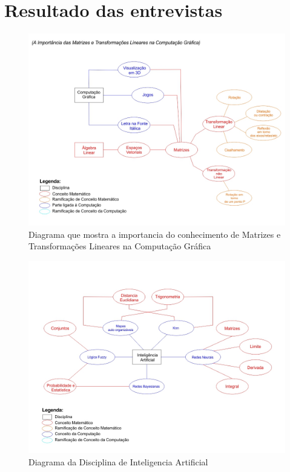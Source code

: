 \documentclass[12pt,a4paper]{article}
\begin{document}
\section{Resultado das entrevistas}

\begin{figure}[!h]
\includegraphics[scale=0.4]{imagens/DiagramaEXTRA.jpg} 
\caption{Diagrama que mostra a importancia do conhecimento de Matrizes e Transformações Lineares na Computação Gráfica}
\end{figure}

\begin{figure}[!h]
\centering
\includegraphics[scale=0.4]{imagens/IA.jpg} 
\caption{Diagrama da Disciplina de Inteligencia Artificial}
\end{figure}
\end{document}
